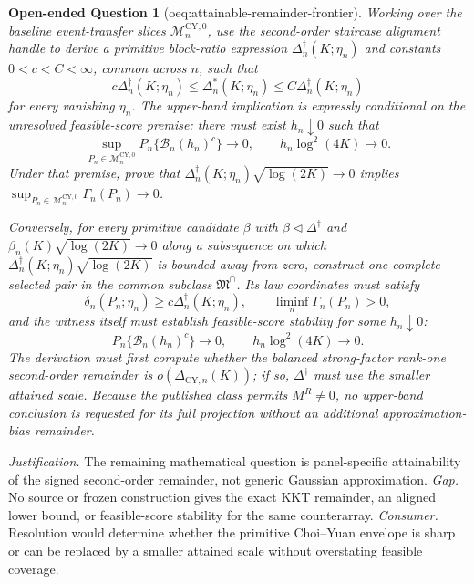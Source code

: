 \documentclass{article}
\newtheorem{openendedquestion}{Open-ended Question}
\begin{document}
\begin{openendedquestion}[oeq:attainable-remainder-frontier]\label{oeq:attainable-remainder-frontier}
Working over the baseline event-transfer slices
\(\mathcal M_n^{\mathrm{CY},0}\), use the second-order staircase alignment
handle to derive a primitive block-ratio expression
\(\Delta_n^{\dagger}(K;\eta_n)\) and constants
\(0<c<C<\infty\), common across \(n\), such that
\[
 c\Delta_n^{\dagger}(K;\eta_n)
 \le\Delta_n^*(K;\eta_n)
 \le C\Delta_n^{\dagger}(K;\eta_n)
\]
for every vanishing \(\eta_n\).  The upper-band implication is expressly
conditional on the unresolved feasible-score premise: there must exist
\(h_n\downarrow0\) such that
\[
 \sup_{P_n\in\mathcal M_n^{\mathrm{CY},0}}
 P_n\{\mathcal B_n(h_n)^c\}\to0,
 \qquad h_n\log^2(4K)\to0.
\]
Under that premise, prove that
\(\Delta_n^{\dagger}(K;\eta_n)\sqrt{\log(2K)}\to0\) implies
\(\sup_{P_n\in\mathcal M_n^{\mathrm{CY},0}}\Gamma_n(P_n)\to0\).

Conversely, for every primitive candidate \(\beta\) with
\(\beta\triangleleft\Delta^\dagger\) and
\(\beta_n(K)\sqrt{\log(2K)}\to0\) along a subsequence on which
\(\Delta_n^\dagger(K;\eta_n)\sqrt{\log(2K)}\) is bounded away from zero,
construct one complete selected pair in the common subclass
\(\mathfrak M^\cap\).  Its law coordinates must satisfy
\[
 \delta_n(P_n;\eta_n)\ge c\Delta_n^\dagger(K;\eta_n),
 \qquad \liminf_n\Gamma_n(P_n)>0,
\]
and the witness itself must establish feasible-score stability for some
\(h_n\downarrow0\):
\[
 P_n\{\mathcal B_n(h_n)^c\}\to0,
 \qquad h_n\log^2(4K)\to0.
\]
The derivation must first compute whether the balanced strong-factor
rank-one second-order remainder is
\(o(\Delta_{\mathrm{CY},n}(K))\); if so,
\(\Delta^\dagger\) must use the smaller attained scale.  Because the
published class permits \(M^R\ne0\), no upper-band conclusion is requested
for its full projection without an additional approximation-bias remainder.
\end{openendedquestion}
\par\smallskip\noindent \textit{Justification.} The remaining mathematical question is panel-specific attainability of the signed second-order remainder, not generic Gaussian approximation. \textit{Gap.} No source or frozen construction gives the exact KKT remainder, an aligned lower bound, or feasible-score stability for the same counterarray. \textit{Consumer.} Resolution would determine whether the primitive Choi--Yuan envelope is sharp or can be replaced by a smaller attained scale without overstating feasible coverage.
\end{document}

